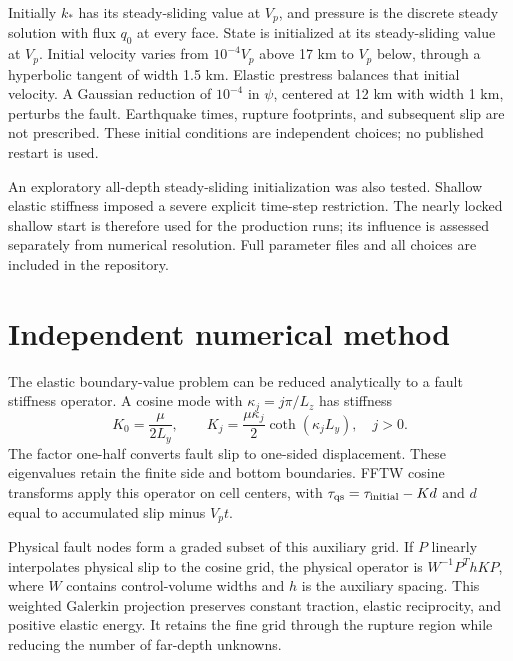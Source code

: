\documentclass[11pt]{article}
\begin{document}
Initially $k_*$ has its steady-sliding value at $V_p$, and pressure is the
discrete steady solution with flux $q_0$ at every face. State is initialized at
its steady-sliding value at $V_p$. Initial velocity varies from $10^{-4}V_p$
above 17 km to $V_p$ below, through a hyperbolic tangent of width 1.5 km.
Elastic prestress balances that initial velocity. A Gaussian reduction of
$10^{-4}$ in $\psi$, centered at 12 km with width 1 km, perturbs the fault.
Earthquake times, rupture footprints, and subsequent slip are not prescribed.
These initial conditions are independent choices; no published restart is used.

An exploratory all-depth steady-sliding initialization was also tested.
Shallow elastic stiffness imposed a severe explicit time-step restriction.
The nearly locked shallow start is therefore used for the production runs;
its influence is assessed separately from numerical resolution. Full parameter
files and all choices are included in the repository.

\section{Independent numerical method}
The elastic boundary-value problem can be reduced analytically to a fault
stiffness operator. A cosine mode with $\kappa_j=j\pi/L_z$ has stiffness
\begin{equation}
 K_0=\frac{\mu}{2L_y},\qquad
 K_j=\frac{\mu\kappa_j}{2}\coth(\kappa_jL_y),\quad j>0.
\end{equation}
The factor one-half converts fault slip to one-sided displacement. These
eigenvalues retain the finite side and bottom boundaries. FFTW cosine transforms
apply this operator on cell centers, with $\tau_{\rm qs}=\tau_{\rm initial}-Kd$
and $d$ equal to accumulated slip minus $V_pt$.

Physical fault nodes form a graded subset of this auxiliary grid. If $P$
linearly interpolates physical slip to the cosine grid, the physical operator is
$W^{-1}P^T h K P$, where $W$ contains control-volume widths and $h$ is the
auxiliary spacing. This weighted Galerkin projection preserves constant traction,
elastic reciprocity, and positive elastic energy. It retains the fine grid
through the rupture region while reducing the number of far-depth unknowns.
\end{document}
